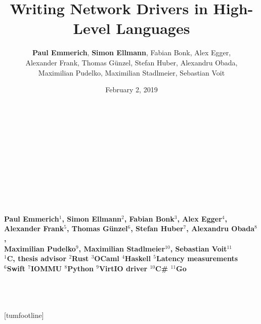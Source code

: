 \documentclass[NET,english,aspectratio=43,notitleframe]{tumbeamer}
\author[Paul Emmerich, Simon Ellmann]{\textbf{Paul Emmerich}, \textbf{Simon Ellmann}, Fabian Bonk, Alex Egger,\\ Alexander Frank, Thomas Günzel, Stefan Huber, Alexandru Obada,\\ Maximilian Pudelko, Maximilian Stadlmeier, Sebastian Voit}
\title{Writing Network Drivers in High-Level Languages}
\date{February 2, 2019}
\begin{document}
  \begin{frame}[c,noframenumbering]
  \centering%
  \Large%
  \strut\textcolor{TUMBlue}{\inserttitle}%
  \\[4ex]%
  \normalsize%
\footnotesize  \strut\insertauthor%
  \\[2ex]%
  \footnotesize%
  \insertdate%
  \\[4ex]%
  \ifdefined\departmentname%
    \ifdefined\chairname%
      \chairname\\%
    \fi%
    \departmentname\\%
  \fi%
  \TUMname\\%
\end{frame}

  \begin{frame}[c,noframenumbering]
  \centering%
  \Large%
  \strut\textcolor{TUMBlue}{\inserttitle}%
  \\[4ex]%
  \footnotesize%
  \strut{} \bfseries Paul Emmerich$^1$, Simon Ellmann$^2$, Fabian Bonk$^3$, Alex Egger$^4$,\\ Alexander Frank$^5$, Thomas Günzel$^6$, Stefan Huber$^7$, Alexandru Obada$^8$,\\ Maximilian Pudelko$^9$, Maximilian Stadlmeier$^{10}$, Sebastian Voit$^{11}$ \normalfont %
  \\[2ex]%
  \scriptsize%
  $^1$C, thesis advisor\hspace{1em}
  $^2$Rust\hspace{1em}
  $^3$OCaml\hspace{1em}
  $^4$Haskell\hspace{1em}
  $^5$Latency measurements\hspace{1em}\\
  $^6$Swift\hspace{1em}
  $^7$IOMMU\hspace{1em}
  $^8$Python\hspace{1em}
  $^9$VirtIO driver\hspace{1em}
  $^{10}$C\#\hspace{1em}
  $^{11}$Go\hspace{1em}
  \\[4ex]%
  \footnotesize
    \ifdefined\departmentname%
    \ifdefined\chairname%
      \chairname\\%
    \fi%
    \departmentname\\%
  \fi%
  \TUMname\\%
\end{frame}
[tumfootline]
\end{document}
